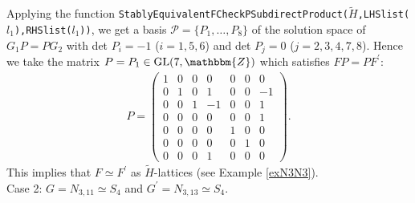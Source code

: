 \documentclass{amsart}
\theoremstyle{plain}
\theoremstyle{definition}
\theoremstyle{remark}
\newcommand{\bZ}{\mathbbm{Z}}\newcommand{\bQ}{\mathbbm{Q}}
\newcommand{\GL}{{\rm GL}}\newcommand{\SL}{{\rm SL}}
\begin{document}
Applying the function 
{\tt StablyEquivalentFCheckPSubdirectProduct($\widetilde{H}$,LHSlist($l_1$),RHSlist($l_1$))}, we get a basis $\mathcal{P}=\{P_1,\dots,P_8\}$ 
of the solution space of $G_1P=PG_2$ 
with det $P_i=-1$ ($i=1,5,6$) and det $P_j=0$ ($j=2,3,4,7,8$). 
Hence we take the matrix $P=P_1\in \GL(7,\bZ)$ 
which satisfies $FP=PF^\prime$: 
\begin{align*}
P=\left(\begin{array}{ccccccc} 
1&0&0&0&0&0&0\\
0&1&0&1&0&0&-1\\
0&0&1&-1&0&0&1\\
0&0&0&0&0&0&1\\
0&0&0&0&1&0&0\\
0&0&0&0&0&1&0\\
0&0&0&1&0&0&0
\end{array}\right). 
\end{align*}
This implies that $F\simeq F^\prime$ as $\widetilde{H}$-lattices 
(see Example \ref{exN3N3}).\\ 

Case 2: $G=N_{3,11}\simeq S_4$ and $G^\prime=N_{3,13}\simeq S_4$. 
\end{document}
